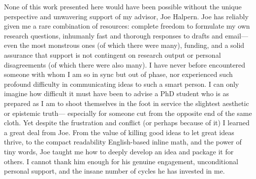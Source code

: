 %
%
None of this work presented here would have been possible without the unique perspective and unwavering support of my advisor, Joe Halpern. 
Joe has reliably given me a rare combination of resources:
complete freedom to formulate my own research questions,
inhumanly fast and thorough responses to drafts and email---even the most monstrous ones (of which there were many),
funding, and a solid assurance that support is not contingent on research output or personal disagreements (of which there were also many).
%
%
I have never before encountered someone with whom I am so in sync but out of phase, 
    nor experienced such profound difficulty in communicating ideas to such a smart person. 
%
I can only imagine how difficult it must have been
    to advise a PhD student
    who is as prepared as I am to shoot themselves in the foot
        in service the slightest aesthetic or epistemic truth---%
    especially for someone cut from the opposite end of the same cloth.
%
Yet despite the frustration and conflict (or perhaps because of it) I learned a great deal from Joe. 
    From the value of killing good ideas to let great ideas thrive, 
        to the compact readability English-based inline math, 
        and the power of tiny words,
    Joe taught me how to deeply develop an idea and package it for others.
I cannot thank him enough for his genuine engagement, unconditional personal support, and the insane number of cycles he has invested in me. 

%
%


